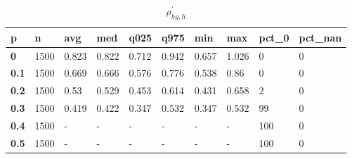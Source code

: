 \begin{table}[h]
 \centering 
\footnotesize
\caption{$\rho_{hg,h}^\prime $}
\label{tab:alphahgh}
\begin{tabular}[h]{|l|l|l|l|l|l|l|l|l|l|
    } \hline
\textbf{ p} & \textbf{ n} & \textbf{ avg} & \textbf{ med} & \textbf{ q025} & \textbf{ q975} & \textbf{ min} & \textbf{ max} & \textbf{ pct\_0} & \textbf{ pct\_nan}
    \\ \hline
  \textbf{  0} & 1500 & 0.823 & 0.822 & 0.712 & 0.942 & 0.657 & 1.026 &   0 & 0
    \\ \hline
  \textbf{0.1} & 1500 & 0.669 & 0.666 & 0.576 & 0.776 & 0.538 &  0.86 &   0 & 0
    \\ \hline
  \textbf{0.2} & 1500 &  0.53 & 0.529 & 0.453 & 0.614 & 0.431 & 0.658 &   2 & 0
    \\ \hline
  \textbf{0.3} & 1500 & 0.419 & 0.422 & 0.347 & 0.532 & 0.347 & 0.532 &  99 & 0
    \\ \hline
  \textbf{0.4} & 1500 & - & - & - & - & - & - & 100 & 0
    \\ \hline
  \textbf{0.5} & 1500 & - & - & - & - & - & - & 100 & 0
    \\ \hline
 \end{tabular}
 \end{table}
